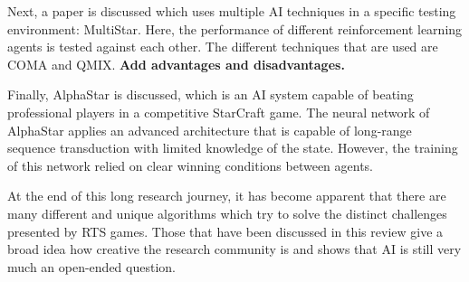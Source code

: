 Next, a paper is discussed which uses multiple AI techniques in a specific testing environment: MultiStar. Here, the performance of different reinforcement learning agents is tested against each other. The different techniques that are used are COMA and QMIX. \textbf{Add advantages and disadvantages.}

Finally, AlphaStar is discussed, which is an AI system capable of beating professional players in a competitive StarCraft game. The neural network of AlphaStar applies an advanced architecture that is  capable of long-range sequence transduction with limited knowledge of the state. However, the training of this network relied on clear winning conditions between agents.

At the end of this long research journey, it has become apparent that there are many different and unique algorithms which try to solve the distinct challenges presented by RTS games. Those that have been discussed in this review give a broad idea how creative the research community is and shows that AI is still very much an open-ended question.